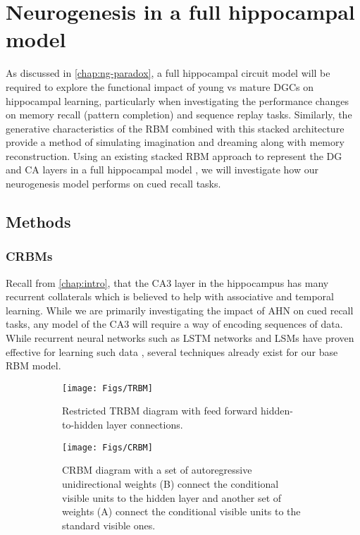 \chapter{Neurogenesis in a full hippocampal model}
\label{chap:full-model}

As discussed in \cref{chap:ng-paradox}, a full hippocampal circuit model 
will be required to explore the functional impact of young vs mature 
\acp{DGC} on hippocampal learning, particularly when 
investigating the performance changes on memory recall (pattern completion) and 
sequence replay tasks. 
Similarly, the generative characteristics of the \ac{RBM} 
combined with this stacked architecture provide a method of 
simulating imagination and dreaming along with memory reconstruction. 
Using an existing stacked \ac{RBM} approach to represent the 
\ac{DG} and CA layers in a full hippocampal model \citep{becker-hinton-SFN-abstract, hippocampal-trbm},
we will investigate how our neurogenesis model performs on cued recall tasks.

\section{Methods}
\subsection{\acp{CRBM}}

Recall from \cref{chap:intro}, that the CA3 layer in the hippocampus has many 
recurrent collaterals which is believed to help with associative and 
temporal learning. 
While we are primarily investigating the impact of \ac{AHN} on 
cued recall tasks, any model of the CA3 will 
require a way of encoding sequences of data. 
While recurrent neural networks such as \ac{LSTM} networks 
\citep{lstm-orig} and \acp{LSM} \citep{lsm} have proven effective for 
learning such data \citep{lstm-sequence,lstm-timeseries}, 
several techniques already exist for our base \ac{RBM} model.

 \begin{figure}[!hp]
\centering
\begin{subfigure}[b]{.4\textwidth}
	\texttt{[image: Figs/TRBM]}
	\caption{Restricted \ac{TRBM} diagram with feed forward hidden-to-hidden layer connections.}
	\label{fig:trbm}
\end{subfigure}
\qquad\qquad
\begin{subfigure}[b]{.35\textwidth}
	\texttt{[image: Figs/CRBM]}
	\caption{\ac{CRBM} diagram with a set of autoregressive unidirectional weights (B) connect the 
		conditional visible units to the hidden layer and another set of weights (A) connect the 
		conditional visible units to the standard visible ones.
	}
	\label{fig:crbm}
\end{subfigure}
\label{fig:temporal-rbms}
\caption{}
\end{figure}

